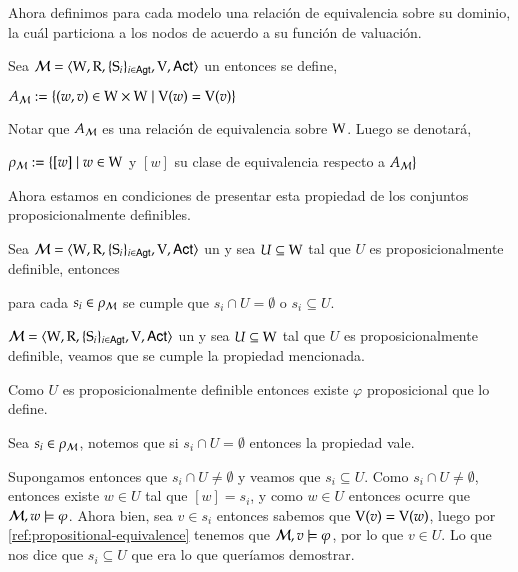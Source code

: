 Ahora definimos para cada modelo una relación de equivalencia sobre su dominio, la cuál particiona a los nodos de acuerdo
a su función de valuación.

\begin{definicion}
    Sea $\mathcal{M}=\langle \mathrm{W},\mathrm{R},\{ \mathrm{S}_i \}_{i \in {\rm \sf Agt}},\mathrm{V},{\rm \sf Act} \rangle$ un \ults entonces se define, 
    \begin{center}
        $A_{\mathcal{M}} := \{(w,v) \in \mathrm{W} \times \mathrm{W} \mid \mathrm{V}(w) = \mathrm{V}(v)\}$
    \end{center}
    Notar que $A_{\mathcal{M}}$ es una relación de equivalencia sobre $\mathrm{W}$. Luego se denotará,
    \begin{center}
        $\rho_{\mathcal{M}} := \{ [w] \mid w \in \mathrm{W} $ y $[w]$ su clase de equivalencia respecto a $A_{\mathcal{M}}\}$
    \end{center}
\end{definicion}

Ahora estamos en condiciones de presentar esta propiedad de los conjuntos proposicionalmente definibles.

\begin{lema}\label{ref:propositionaly-definable-lemma}
    Sea $\mathcal{M}=\langle \mathrm{W},\mathrm{R},\{ \mathrm{S}_i \}_{i \in {\rm \sf Agt}},\mathrm{V},{\rm \sf Act} \rangle$ un \ults y sea $U \subseteq \mathrm{W}$ tal que $U$ es proposicionalmente definible, entonces
    \begin{center}
        para cada $s_i \in \rho_{\mathcal{M}}$ se cumple que $s_i \cap U = \emptyset$ o $s_i \subseteq U$.
    \end{center}
\end{lema}

\begin{demostracion}
    $\mathcal{M}=\langle \mathrm{W},\mathrm{R},\{ \mathrm{S}_i \}_{i \in {\rm \sf Agt}},\mathrm{V},{\rm \sf Act} \rangle$ un \ults y sea $U \subseteq \mathrm{W}$ tal que $U$ es proposicionalmente definible, 
    veamos que se cumple la propiedad mencionada.

    Como $U$ es proposicionalmente definible entonces existe $\varphi$ proposicional que lo define.

    Sea $s_i \in \rho_{\mathcal{M}}$, notemos que si $s_i \cap U = \emptyset$ entonces la propiedad vale.
    
    Supongamos entonces que $s_i \cap U \neq \emptyset$ y veamos que $s_i \subseteq U$. Como $s_i \cap U \neq \emptyset$, entonces existe 
    $w \in U$ tal que $[w] = s_i$, y como $w \in U$ entonces ocurre que $\mathcal{M},w \models \varphi$. Ahora bien, sea $v \in s_i$ 
    entonces sabemos que $\mathrm{V}(v) = \mathrm{V}(w)$, luego por \ref{ref:propositional-equivalence} tenemos que $\mathcal{M},v \models \varphi$, por 
    lo que $v \in U$. Lo que nos dice que $s_i \subseteq U$ que era lo que queríamos demostrar.  
\end{demostracion}

